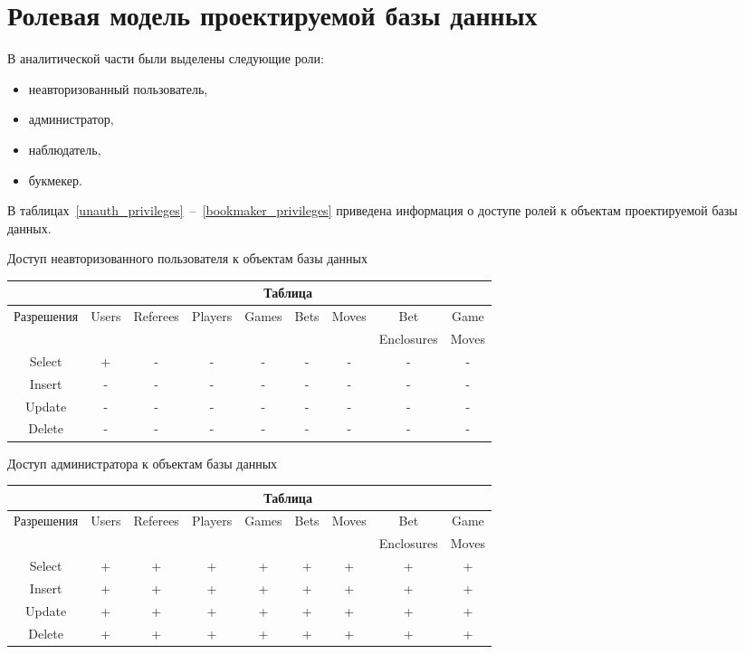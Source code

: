 \section{Ролевая модель проектируемой базы данных}

В аналитической части были выделены следующие роли:
\begin{itemize}
	\item неавторизованный пользователь,
	\item администратор, 
	\item наблюдатель,
	\item букмекер.
\end{itemize}

В таблицах~\ref{unauth_privileges}~--~\ref{bookmaker_privileges} приведена информация о доступе ролей к объектам проектируемой базы данных.
\begin{center}
	\begin{threeparttable}
		\captionsetup{justification=raggedright,singlelinecheck=off}
		\caption{\label{unauth_privileges}Доступ неавторизованного пользователя к объектам базы данных}
		\centering
		\begin{tabular}{|c|c|c|c|c|c|c|c|c|}
			\hline
			& \multicolumn{8}{|c|}{Таблица} \\
			\hline
			Разрешения & Users & Referees & Players & Games & Bets & Moves & Bet & Game \\
			&&&&&&& Enclosures & Moves \\
			\hline
			Select & + & - & - & - & - & - & - & - \\
			\hline
			Insert & - & - & - & - & - & - & - & - \\
			\hline
			Update & - & - & - & - & - & - & - & - \\
			\hline
			Delete & - & - & - & - & - & - & - & - \\
			\hline
		\end{tabular}
	\end{threeparttable}
\end{center}
\begin{center}
	\begin{threeparttable}
		\captionsetup{justification=raggedright,singlelinecheck=off}
		\caption{\label{admin_privileges}Доступ администратора к объектам базы данных}
		\centering
		\begin{tabular}{|c|c|c|c|c|c|c|c|c|}
			\hline
			& \multicolumn{8}{|c|}{Таблица} \\
			\hline
			Разрешения & Users & Referees & Players & Games & Bets & Moves & Bet & Game \\
			&&&&&&& Enclosures & Moves \\
			\hline
			Select & + & + & + & + & + & + & + & + \\
			\hline
			Insert& + & + & + & + & + & + & + & + \\
			\hline
			Update & + & + & + & + & + & + & + & + \\
			\hline
			Delete & + & + & + & + & + & + & + & + \\
			\hline
		\end{tabular}
	\end{threeparttable}
\end{center}
